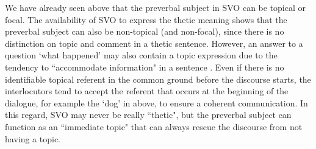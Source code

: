 \documentclass[output=paper,colorlinks,citecolor=brown,
]{langscibook}
\begin{document}
We have already seen above that the preverbal subject in SVO can be topical or focal. The availability of SVO to express the thetic meaning shows that the preverbal subject can also be non-topical (and non-focal), since there is no distinction on topic and comment in a thetic sentence. However, an answer to a question `what happened' may also contain a topic expression due to the tendency to ``accommodate information" in a sentence \citep{Lewis1979, Stalnaker2002, vonFintel2008, vanderWal2016}. Even if there is no identifiable topical referent in the common ground before the discourse starts, the interlocutors tend to accept the referent that occurs at the beginning of the dialogue, for example the `dog' in  above, to ensure a coherent communication. In this regard, SVO may never be really ``thetic", but the preverbal subject can function as an ``immediate topic" that can always rescue the discourse from not having a topic.
\end{document}
